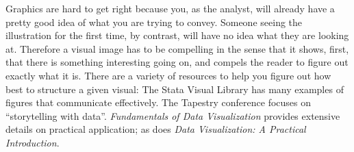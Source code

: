 Graphics are hard to get right because you, as the analyst,
will already have a pretty good idea of what you are trying to convey.
Someone seeing the illustration for the first time,
by contrast, will have no idea what they are looking at.
Therefore a visual image has to be compelling in the sense
that it shows, first, that there is something interesting going on,
and compels the reader to figure out exactly what it is.
There are a variety of resources to help you
figure out how best to structure a given visual:
The Stata Visual Library has many examples of figures that communicate effectively.
The Tapestry conference focuses on ``storytelling with data''.
\textit{Fundamentals of Data Visualization} provides extensive details on practical application;
as does \textit{Data Visualization: A Practical Introduction}.




